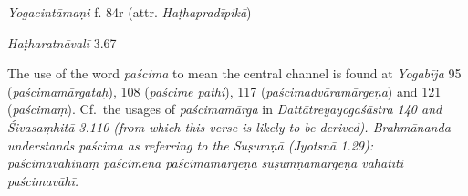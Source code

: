 \begin{ekdosis}
\begin{sources}[hp01_029]
\begin{versinnote}
\end{versinnote}

\end{sources}

\begin{testimonia}[hp01_029]
\emph{Yogacintāmaṇi} f. 84r (attr. \emph{Haṭhapradīpikā})

\begin{versinnote}
\end{versinnote}

\emph{Haṭharatnāvalī} 3.67

\begin{versinnote}
\end{versinnote}

\end{testimonia}

\begin{philcomm}[hp01_029]
 The use of the word \emph{paścima} to mean the central channel is found at \emph{Yogabīja} 95 (\emph{paścimamārgataḥ}), 108 (\emph{paścime pathi}), 117 (\emph{paścimadvāramārgeṇa}) and 121 (\emph{paścimaṃ}). Cf.~the usages of \emph{paścima\-mārga} in \sl{Dattātreyayogaśāstra} 140 and \emph{Śivasaṃhitā} 3.110 (from which this verse is likely to be derived). Brahmānanda understands \emph{paścima} as referring to the Suṣumṇā (\emph{Jyotsnā} 1.29): \emph{paścimavāhinaṃ paścimena paścimamārgeṇa suṣumṇāmārgeṇa vahatīti paścimavāhī}.
\end{philcomm}


\end{ekdosis}
